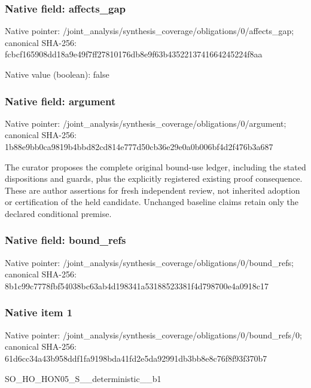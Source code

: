 \documentclass[10pt,a4paper]{article}
\begin{document}
\subsubsection{Native field: affects\_\allowbreak{}gap}
Native pointer: /joint\_\allowbreak{}analysis/synthesis\_\allowbreak{}coverage/obligations/0/affects\_\allowbreak{}gap; canonical SHA-256: fcbcf165908dd18a9e49f7ff27810176db8e9f63b4352213741664245224f8aa

Native value (boolean): false

\subsubsection{Native field: argument}
Native pointer: /joint\_\allowbreak{}analysis/synthesis\_\allowbreak{}coverage/obligations/0/argument; canonical SHA-256: 1b88e9bb0ca9819b4bbd82cd814e777d50cb36e29e0a0b006bf4d2f476b3a687

\begingroup\raggedright\sloppy The curator proposes the complete original bound-use ledger,\allowbreak{} including the stated dispositions and guards,\allowbreak{} plus the explicitly registered existing proof consequence. These are author assertions for fresh independent review,\allowbreak{} not inherited adoption or certification of the held candidate. Unchanged baseline claims retain only the declared conditional premise.\par\endgroup

\subsubsection{Native field: bound\_\allowbreak{}refs}
Native pointer: /joint\_\allowbreak{}analysis/synthesis\_\allowbreak{}coverage/obligations/0/bound\_\allowbreak{}refs; canonical SHA-256: 8b1c99c7778fbf54038bc63ab4d198341a53188523381f4d798700e4a0918c17

\subsubsection{Native item 1}
Native pointer: /joint\_\allowbreak{}analysis/synthesis\_\allowbreak{}coverage/obligations/0/bound\_\allowbreak{}refs/0; canonical SHA-256: 61d6cc34a43b958ddf1fa9198bda41fd2e5da92991db3bb8e8c76f8f93f370b7

\begingroup\raggedright\sloppy SO\_\allowbreak{}HO\_\allowbreak{}HON05\_\allowbreak{}S\_\allowbreak{}\_\allowbreak{}deterministic\_\allowbreak{}\_\allowbreak{}b1\par\endgroup
\end{document}
